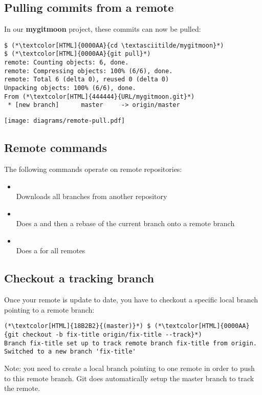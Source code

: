 \subsection{Pulling commits from a remote}
\begin{frame}[fragile]
  \subslidetitle
  In our \textbf{mygitmoon} project, these commits can now be pulled:
  \begin{lstlisting}
$ (*\textcolor[HTML]{0000AA}{cd \textasciitilde/mygitmoon}*)
$ (*\textcolor[HTML]{0000AA}{git pull}*)
remote: Counting objects: 6, done.
remote: Compressing objects: 100% (6/6), done.
remote: Total 6 (delta 0), reused 0 (delta 0)
Unpacking objects: 100% (6/6), done.
From (*\textcolor[HTML]{444444}{URL/mygitmoon.git}*)
 * [new branch]      master     -> origin/master
\end{lstlisting}
\center \texttt{[image: diagrams/remote-pull.pdf]}
\end{frame}

\subsection{Remote commands}
\begin{frame}[fragile]
  \subslidetitle
  The following commands operate on remote repositories:
  \begin{itemize}
    \item {} \\
      Downloads all branches from another repository
    \item {} \\
      Does a  and then a {rebase} of the current branch onto a remote branch
    \item {} \\
      Does a  for all remotes
  \end{itemize}
\end{frame}

\subsection{Checkout a tracking branch}
\begin{frame}[fragile]
  \subslidetitle
  Once your remote is update to date, you have to checkout a specific local branch pointing to a remote branch:

  \begin{lstlisting}
(*\textcolor[HTML]{18B2B2}{(master)}*) $ (*\textcolor[HTML]{0000AA}{git checkout -b fix-title origin/fix-title --track}*)
Branch fix-title set up to track remote branch fix-title from origin.
Switched to a new branch 'fix-title'
\end{lstlisting}
  \vspace{1em}
  Note: you need to create a local branch pointing to one remote in order to push to this remote branch.
  \newline
  Git does automatically setup the master branch to track the remote.
\end{frame}

